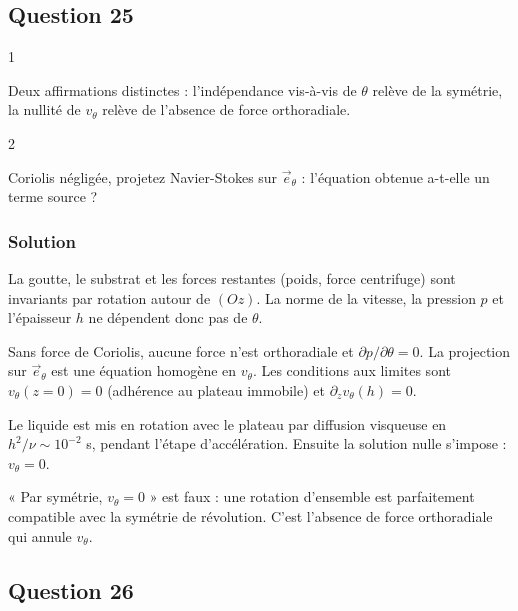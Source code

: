 \documentclass[11pt,a4paper]{article}
\begin{document}
\hypertarget{question-25}{%
\subsection{Question 25}\label{question-25}}

\begin{indication}{1}

Deux affirmations distinctes : l'indépendance vis-à-vis de \(\theta\) relève de la symétrie, la nullité de \(v_\theta\) relève de l'absence de force orthoradiale.

\end{indication}

\begin{indication}{2}

Coriolis négligée, projetez Navier-Stokes sur \(\vec e_\theta\) : l'équation obtenue a-t-elle un terme source ?

\end{indication}

\hypertarget{solution-24}{%
\subsubsection{Solution}\label{solution-24}}

La goutte, le substrat et les forces restantes (poids, force centrifuge) sont invariants par rotation autour de \((Oz)\). La norme de la vitesse, la pression \(p\) et l'épaisseur \(h\) ne dépendent donc pas de \(\theta\).

Sans force de Coriolis, aucune force n'est orthoradiale et \(\partial p/\partial\theta=0\). La projection sur \(\vec e_\theta\) est une équation homogène en \(v_\theta\). Les conditions aux limites sont \(v_\theta(z=0)=0\) (adhérence au plateau immobile) et \(\partial_zv_\theta(h)=0\).

Le liquide est mis en rotation avec le plateau par diffusion visqueuse en \(h^2/\nu\sim10^{-2}\) s, pendant l'étape d'accélération. Ensuite la solution nulle s'impose : \(\boxed{v_\theta=0}\).

\begin{piege}

« Par symétrie, \(v_\theta=0\) » est faux : une rotation d'ensemble est parfaitement compatible avec la symétrie de révolution. C'est l'absence de force orthoradiale qui annule \(v_\theta\).

\end{piege}

\hypertarget{question-26}{%
\subsection{Question 26}\label{question-26}}
\end{document}
